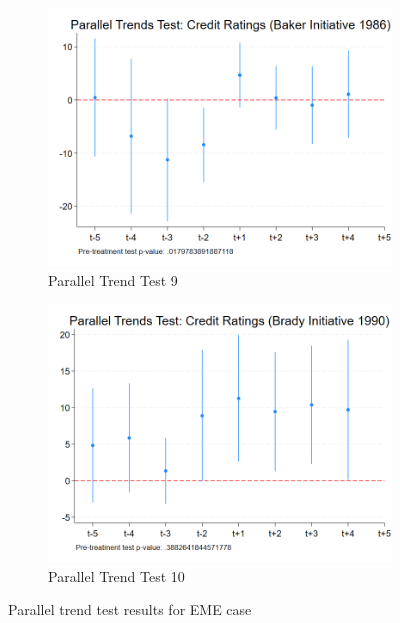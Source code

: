 \begin{figure}[ht!]
    \centering
    \begin{subfigure}[b]{0.48\textwidth}
        \centering
        \includegraphics[width=\textwidth]{figures/PT_Baker_Ratings.png}
        \caption{Parallel Trend Test 9}
        \label{fig:pt9_eme}
    \end{subfigure}
    \hfill
    \begin{subfigure}[b]{0.48\textwidth}
        \centering
        \includegraphics[width=\textwidth]{figures/PT_Brady_Ratings.png}
        \caption{Parallel Trend Test 10}
        \label{fig:pt10_eme}
    \end{subfigure}
    \caption{Parallel trend test results for EME case}
    \label{fig:parallel_trends4}
\end{figure}

